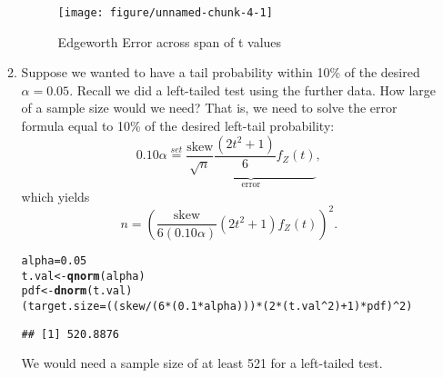 \documentclass{article}\usepackage[]{graphicx}\usepackage[]{xcolor}
\makeatletter
\def\maxwidth{ %
  \ifdim\Gin@nat@width>\linewidth
    \linewidth
  \else
    \Gin@nat@width
  \fi
}
\newcommand{\hlnum}[1]{\textcolor[rgb]{0.686,0.059,0.569}{#1}}%
\newcommand{\hlopt}[1]{\textcolor[rgb]{0,0,0}{#1}}%
\newcommand{\hldef}[1]{\textcolor[rgb]{0.345,0.345,0.345}{#1}}%
\newcommand{\hlkwb}[1]{\textcolor[rgb]{0.69,0.353,0.396}{#1}}%
\newcommand{\hlkwd}[1]{\textcolor[rgb]{0.737,0.353,0.396}{\textbf{#1}}}%
\newenvironment{kframe}{%
 \def\at@end@of@kframe{}%
 \ifinner\ifhmode%
  \def\at@end@of@kframe{\end{minipage}}%
  \begin{minipage}{\columnwidth}%
 \fi\fi%
 \def\FrameCommand##1{\hskip\@totalleftmargin \hskip-\fboxsep
 \colorbox{shadecolor}{##1}\hskip-\fboxsep
     \hskip-\linewidth \hskip-\@totalleftmargin \hskip\columnwidth}%
 \MakeFramed {\advance\hsize-\width
   \@totalleftmargin\z@ \linewidth\hsize
   \@setminipage}}%
 {\par\unskip\endMakeFramed%
 \at@end@of@kframe}
\newenvironment{knitrout}{}{} %
\makeatother
\begin{document}
\begin{enumerate}
\begin{enumerate}
\begin{figure}[H]
\begin{center}
\begin{knitrout}
\color{fgcolor}
\texttt{[image: figure/unnamed-chunk-4-1]} 
\end{knitrout}
\caption{Edgeworth Error across span of t values}
\label{plot1} 
\end{center}
\end{figure}

  \item Suppose we wanted to have a tail probability within 10\% of the desired
  $\alpha=0.05$. Recall we did a left-tailed test using the further data.
  How large of a sample size would we need? That is, we need
  to solve the error formula equal to 10\% of the desired left-tail probability:
  \[0.10 \alpha  \stackrel{set}{=} \underbrace{\frac{\text{skew}}{\sqrt{n}} \frac{(2t^2+1)}{6} f_Z(t)}_{\textrm{error}},\]
  which yields
  \[ n = \left(\frac{\text{skew}}{6(0.10\alpha)} (2t^2 + 1) f_Z(t)\right)^2.\]

\begin{knitrout}
\color{fgcolor}\begin{kframe}
\begin{alltt}
\hldef{alpha} \hlkwb{=} \hlnum{0.05}
\hldef{t.val} \hlkwb{<-} \hlkwd{qnorm}\hldef{(alpha)}
\hldef{pdf} \hlkwb{<-} \hlkwd{dnorm}\hldef{(t.val)}
\hldef{(target.size} \hlkwb{=} \hldef{((skew} \hlopt{/} \hldef{(}\hlnum{6}\hlopt{*}\hldef{(}\hlnum{0.1}\hlopt{*}\hldef{alpha)))} \hlopt{*} \hldef{(}\hlnum{2} \hlopt{*} \hldef{(t.val}\hlopt{^}\hlnum{2}\hldef{)} \hlopt{+} \hlnum{1}\hldef{)} \hlopt{*} \hldef{pdf)}\hlopt{^}\hlnum{2}\hldef{)}
\end{alltt}
\begin{verbatim}
## [1] 520.8876
\end{verbatim}
\end{kframe}
\end{knitrout}
We would need a sample size of at least 521 for a left-tailed test.


\end{enumerate}
\end{enumerate}
\end{document}
